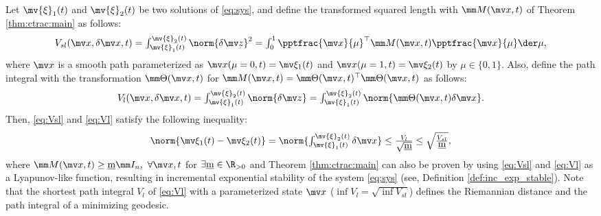 \begin{theorem}
    Let $\mv{\xi}_1(t)$ and $\mv{\xi}_2(t)$ be two solutions of \eqref{eq:sys}, and define the transformed squared length with $\mm M(\bdx,t)$ of Theorem \ref{thm:ctrac:main} as follows:
    \begin{equation}
        V_{sl}(\bdx,\delta\bdx,t)
        =
        \textstyle\int_{\mv{\xi}_1(t)}^{\mv{\xi}_2(t)}
        \norm{\delta\bdz}^2
        =
        \textstyle\int_0^1
        \pptfrac{\bdx}{\mu}^\top
        \mm M(\bdx,t)
        \pptfrac{\bdx}{\mu}
        \der\mu
        ,
        \label{eq:Vsl}
    \end{equation}
    where $\bdx$ is a smooth path parameterized as $\bdx(\mu=0,t)=\mv\xi_1(t)$ and $\bdx(\mu=1,t)=\mv\xi_2(t)$ by $\mu\in\{0,1\}$.
    Also, define the path integral with the transformation $\mm\Theta(\bdx,t)$ for $\mm M(\bdx,t)=\mm\Theta(\bdx,t)^\top\mm\Theta(\bdx,t)$ as follows:
    \begin{equation}
        V_{l}(\bdx,\delta\bdx,t)
        =
        \textstyle\int_{\mv{\xi}_1(t)}^{\mv{\xi}_2(t)}
        \norm{\delta\bdz}
        =
        \textstyle\int_{\mv{\xi}_1(t)}^{\mv{\xi}_2(t)}
        \norm{\mm\Theta(\bdx,t)\delta\bdx}
        .
        \label{eq:Vl}
    \end{equation}
    Then, \eqref{eq:Vsl} and \eqref{eq:Vl} satisfy the following inequality:
    \begin{equation}
        \norm{\mv\xi_1(t)-\mv\xi_2(t)}
        =
        \norm{
            \textstyle\int_{\mv{\xi}_1(t)}^{\mv{\xi}_2(t)}
            \delta\bdx
        }
        \le
        \tfrac{V_{l}}{\sqrt{\underbar{m}}}
        \le
        \sqrt{\tfrac{V_{sl}}{\underbar{m}}}
        ,
        \label{eq:xi_x_Vl_Vsl}
    \end{equation}
    where $\mm M(\bdx,t) \ge \underbar{m}\mm I_n,\ \forall \bdx, t$ for $\exists\underbar{m}\in\R_{>0}$ and Theorem \ref{thm:ctrac:main} can also be proven by using \eqref{eq:Vsl} and \eqref{eq:Vl} as a Lyapunov-like function, resulting in incremental exponential stability of the system \eqref{eq:sys} (see, Definition \ref{def:inc_exp_stable}).
    Note that the shortest path integral $V_l$ of \eqref{eq:Vl} with a parameterized state $\bdx$ (\ie $\inf{V_l}=\sqrt{\inf{V_{sl}}}$) defines the Riemannian distance and the path integral of a minimizing geodesic.
    \label{thm:ctrac:path_int}
\end{theorem}

